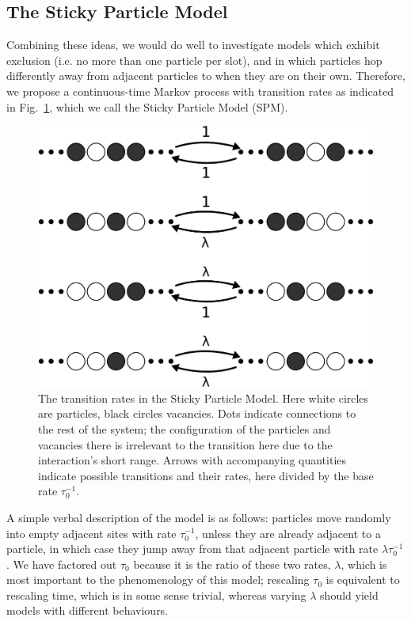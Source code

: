 \subsection{The Sticky Particle Model}
Combining these ideas, we would do well to investigate models which exhibit exclusion (i.e. no more than one 
particle per slot), and in which particles hop differently away from adjacent particles to when they are on their 
own. Therefore, we propose a continuous-time Markov process with transition rates as indicated in
Fig.~\ref{fig:transRates}, which we call the Sticky Particle Model (SPM).
\begin{figure} \caption[The transition rates in the Sticky Particle Model.]{The transition rates in the Sticky Particle Model. Here white circles are particles, black circles vacancies. Dots indicate connections to the rest of 
the system; the configuration of the particles and vacancies there is irrelevant to the transition here due to the
interaction's short range. Arrows with accompanying quantities indicate possible transitions and their rates, here 
divided by the base rate $\tau_0^{-1}$.} 
\label{fig:transRates}
\begin{center}
\includegraphics[width=1.0\textwidth]{intro/images/ratesDB}
\end{center}
\end{figure}
A simple verbal description of the model is as follows: particles move randomly into empty adjacent sites with rate 
$\tau_0^{-1}$, unless they are already adjacent to a particle, in which case they jump away from that adjacent
particle with rate $\lambda \tau_0^{-1}$. We have factored out $\tau_0$ because it is the ratio of these two rates,
$\lambda$, which is most important to the phenomenology of this model; rescaling $\tau_0$ is equivalent to 
rescaling time, which is in some sense trivial, whereas varying $\lambda$ should yield models with different behaviours.

